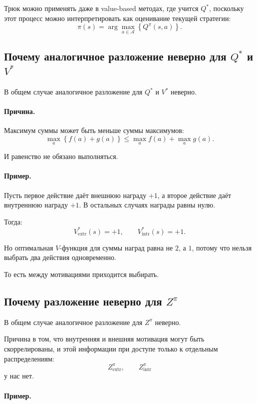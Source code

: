 \documentclass[12pt,a4paper]{article}
\begin{document}
Трюк можно применять даже в value-based методах, где учится $Q^\ast$, поскольку этот процесс можно интерпретировать как оценивание текущей стратегии:
\[
\pi(s)
=
\arg\max_{a\in\mathcal A}
\left\{
Q^\pi(s,a)
\right\}.
\]

\subsection{Почему аналогичное разложение неверно для $Q^\ast$ и $V^\ast$}

В общем случае аналогичное разложение для $Q^\ast$ и $V^\ast$ неверно.

\paragraph{Причина.}

Максимум суммы может быть меньше суммы максимумов:
\[
\max_a
\left\{
f(a)+g(a)
\right\}
\le
\max_a f(a)
+
\max_a g(a).
\]

И равенство не обязано выполняться.

\paragraph{Пример.}

Пусть первое действие даёт внешнюю награду $+1$, а второе действие даёт внутреннюю награду $+1$. В остальных случаях награды равны нулю.

Тогда:
\[
V^\ast_{\mathrm{extr}}(s)=+1,
\qquad
V^\ast_{\mathrm{intr}}(s)=+1.
\]

Но оптимальная $V$-функция для суммы наград равна не $2$, а $1$, потому что нельзя выбрать два действия одновременно.

То есть между мотивациями приходится выбирать.

\subsection{Почему разложение неверно для $Z^\pi$}

В общем случае аналогичное разложение для $Z^\pi$ неверно.

Причина в том, что внутренняя и внешняя мотивация могут быть скоррелированы, и этой информации при доступе только к отдельным распределениям:
\[
Z^\pi_{\mathrm{extr}},
\qquad
Z^\pi_{\mathrm{intr}}
\]
у нас нет.

\paragraph{Пример.}
\end{document}
